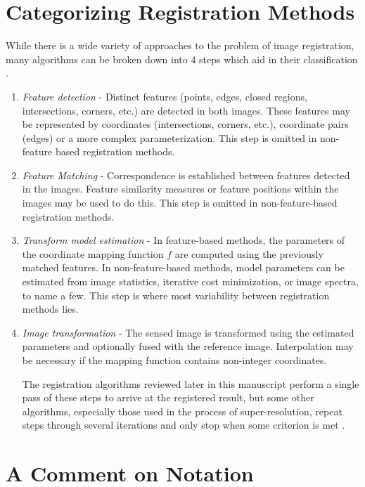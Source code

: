 \documentclass[tocnosub,noragright,centerchapter,12pt]{uiucecethesis09}
\begin{document}
\section{Categorizing Registration Methods} \label{sec:steps}

While there is a wide variety of approaches to the problem of image registration, many algorithms can be broken down into 4 steps which aid in their classification \cite{zitova}.

\begin{enumerate}
    \item \emph{Feature detection} - Distinct features (points, edges, closed regions, intersections, corners, etc.) are detected in both images.  These features may be represented by coordinates (intersections, corners, etc.), coordinate pairs (edges) or a more complex parameterization.  This step is omitted in non-feature based registration methods.

    \item \emph{Feature Matching} - Correspondence is established between features detected in the images.  Feature similarity measures or feature positions within the images may be used to do this.  This step is omitted in non-feature-based registration methods.

    \item \emph{Transform model estimation} - In feature-based methods, the parameters of the coordinate mapping function $f$ are computed using the previously matched features.  In non-feature-based methods, model parameters can be estimated from image statistics, iterative cost minimization, or image spectra, to name a few.  This step is where most variability between registration methods lies.

    \item \emph{Image transformation} - The sensed image is transformed using the estimated parameters and optionally fused with the reference image.  Interpolation may be necessary if the mapping function contains non-integer coordinates.

The registration algorithms reviewed later in this manuscript perform a single pass of these steps to arrive at the registered result, but some other algorithms, especially those used in the process of super-resolution, repeat steps through several iterations and only stop when some criterion is met \cite{farsiu2004}.
\end{enumerate}

\section{A Comment on Notation}
\end{document}
